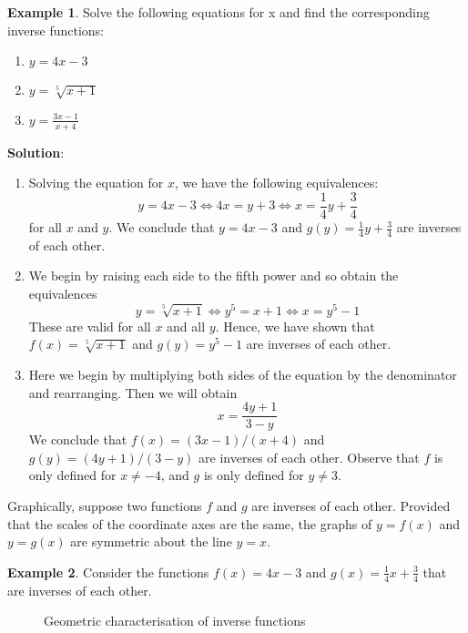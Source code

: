 \documentclass[10pt,a4paper]{book}
\theoremstyle{definition}\newtheorem{definition}{Definition}
\theoremstyle{definition}\newtheorem{fact}{Fact}
\theoremstyle{definition}\newtheorem{ex}{Ex.}
\theoremstyle{definition}\newtheorem{project}{Project}
\theoremstyle{definition}\newtheorem{problem}{Problem}
\theoremstyle{definition}\newtheorem{example}{Example}
\numberwithin{theorem}{chapter}
\numberwithin{corollary}{chapter}
\numberwithin{assumption}{chapter}
\numberwithin{definition}{chapter}
\numberwithin{prop}{chapter}
\numberwithin{notation}{chapter}
\numberwithin{problem}{chapter}
\numberwithin{example}{chapter}
\numberwithin{fact}{chapter}
\numberwithin{ex}{chapter}
\begin{document}
	\begin{example}
		Solve the following equations for x and find the corresponding inverse functions:
		\begin{enumerate}[label=(\alph*)]
			\item $y=4x-3$
			\item $y=\sqrt[5]{x+1}$
			\item $y=\frac{3x-1}{x+4}$
		\end{enumerate}
		\textbf{Solution}:
		\begin{enumerate}[label=(\alph*)]
			\item Solving the equation for $x$, we have the following equivalences: 
			$$y = 4 x - 3 \Leftrightarrow 4 x = y + 3 \Leftrightarrow x = \frac{1}{4} y + \frac{3}{4}$$
			for all $x$ and $y$. We conclude that $y = 4 x - 3$ and $g(y)=\frac{1}{4} y + \frac{3}{4}$ are inverses of each other.
			\item We begin by raising each side to the fifth power and so obtain the equivalences 
			$$y=\sqrt[5]{x+1} \Leftrightarrow y^5 =x+1 \Leftrightarrow x=y^5 -1$$
			These are valid for all $x$ and all $y$. Hence, we have shown that $f(x) = \sqrt[5]{x+1}$ and $g(y) = y^5 - 1$ are inverses of each other.
			\item Here we begin by multiplying both sides of the equation by the denominator and rearranging. Then we will obtain
			$$x = \frac{4y+1}{3-y}$$
			We conclude that $f(x) = (3x - 1)/(x + 4)$ and $g(y) = (4y + 1)/(3 - y)$ are inverses of each other. Observe that $f$ is only defined for $x \neq -4$, and $g$ is only defined for $y \neq 3$.
		\end{enumerate}
	\end{example}
	
	Graphically, suppose two functions $f$ and $g$ are inverses of each other. Provided that the scales of the coordinate axes are the same, the graphs of $y = f (x)$ and $y = g(x)$ are symmetric about the line $y = x$.
	
	\begin{example}
		Consider the functions $f(x)=4x-3$ and $g(x)=\frac{1}{4}x+\frac{3}{4}$ that are inverses of each other.
		\begin{figure}[ht]
			\centering
			\caption{Geometric characterisation of inverse functions}
		\end{figure}
	\end{example}
	
\end{document}
